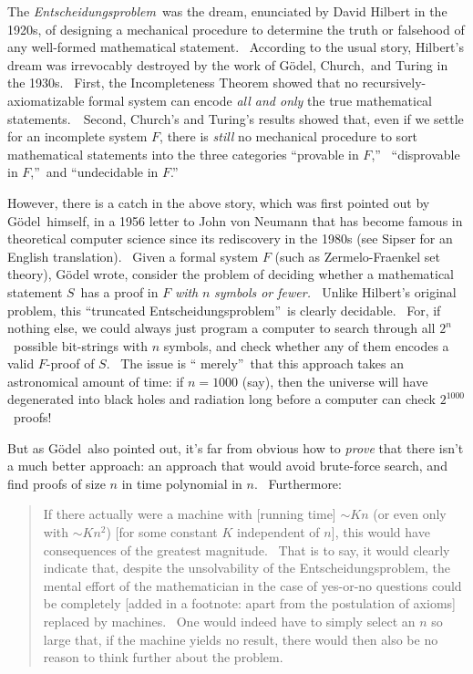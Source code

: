 \documentclass[11pt,onecolumn]{article}%
\begin{document}
The \textit{Entscheidungsproblem}\ was the dream, enunciated by David Hilbert
in the 1920s, of designing a mechanical procedure to determine the truth or
falsehood of any well-formed mathematical statement. \ According to the usual
story, Hilbert's dream was irrevocably destroyed by the work of G\"{o}del,
Church,\ and Turing in the 1930s. \ First, the Incompleteness Theorem showed
that no recursively-axiomatizable formal system can encode \textit{all and
only} the true mathematical statements.\ \ Second, Church's and Turing's
results showed that, even if we settle for an incomplete system $F$, there is
\textit{still} no mechanical procedure to sort mathematical statements into
the three categories \textquotedblleft provable in $F$,\textquotedblright%
\ \textquotedblleft disprovable in $F$,\textquotedblright\ and
\textquotedblleft undecidable in $F$.\textquotedblright

However, there is a catch in the above story, which was first pointed out by
G\"{o}del\ himself, in a 1956 letter to John von Neumann that has become
famous in theoretical computer science since its rediscovery in the 1980s (see
Sipser \cite{sipser:pnp} for an English translation). \ Given a formal system
$F$ (such as Zermelo-Fraenkel set theory), G\"{o}del wrote, consider the
problem of deciding whether a mathematical statement $S$\ has a proof in $F$
\textit{with }$n$\textit{ symbols or fewer. \ }Unlike Hilbert's original
problem, this \textquotedblleft truncated
Entscheidungsproblem\textquotedblright\ is clearly decidable. \ For, if
nothing else, we could always just program a computer to search through all
$2^{n}$\ possible bit-strings with $n$ symbols, and check whether any of them
encodes a valid $F$-proof of $S$. \ The issue is \textquotedblleft
merely\textquotedblright\ that this approach takes an astronomical amount of
time: if $n=1000$ (say), then the universe will have degenerated into black
holes and radiation long before a computer can check $2^{1000}$\ proofs!

But as G\"{o}del\ also pointed out, it's far from obvious how to
\textit{prove} that there isn't a much better approach: an approach that would
avoid brute-force search, and find proofs of size $n$ in time polynomial in
$n$. \ Furthermore:

\begin{quotation}
\noindent If there actually were a machine with [running time] $\sim Kn$ (or
even only with $\sim Kn^{2}$) [for some constant $K$ independent of $n$], this
would have consequences of the greatest magnitude. \ That is to say, it would
clearly indicate that, despite the unsolvability of the Entscheidungsproblem,
the mental effort of the mathematician in the case of yes-or-no questions
could be completely [added in a footnote: apart from the postulation of
axioms] replaced by machines. \ One would indeed have to simply select an $n$
so large that, if the machine yields no result, there would then also be no
reason to think further about the problem.
\end{quotation}
\end{document}
